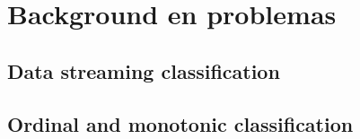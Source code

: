 \chapter[Capítulo 2. Background en problemas]{Background en problemas}

\section{Data streaming classification}

\section{Ordinal and monotonic classification}

\newpage

